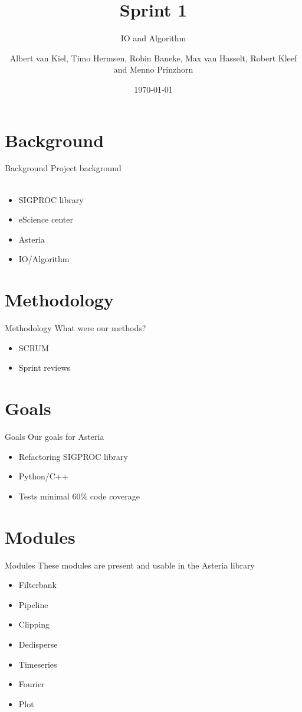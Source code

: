 \documentclass{beamer}
\title{Sprint 1}
\subtitle{IO and Algorithm}
\author{Albert van Kiel, Timo Hermsen, Robin Baneke, Max van Hasselt, Robert Kleef and Menno Prinzhorn}
\date{\today}
\begin{document}
\begin{frame}
    \titlepage
\end{frame}

\section{Background}
    
\begin{frame}{Background}
    Project background
    \\~\\
    \begin{itemize}
        \item SIGPROC library
        \item eScience center
        \item Asteria
        \item IO/Algorithm
    \end{itemize}
\end{frame}

\section{Methodology}
	\begin{frame}{Methodology}
	What were our methods?     
	\begin{itemize}
		\item SCRUM
		\item Sprint reviews
	\end{itemize}
\end{frame}

\section{Goals}
\begin{frame}{Goals}
    Our goals for Asteria      
    \begin{itemize}
        \item Refactoring SIGPROC library
        \item Python/C++
        \item Tests minimal 60\% code coverage
    \end{itemize}
\end{frame}

\section{Modules}
\begin{frame}{Modules}
	These modules are present and usable in the Asteria library     
	\begin{itemize}
		\item Filterbank
		\item Pipeline
		\item Clipping
		\item Dedisperse
		\item Timeseries
		\item Fourier
		\item Plot
	\end{itemize}
\end{frame}
\end{document}
